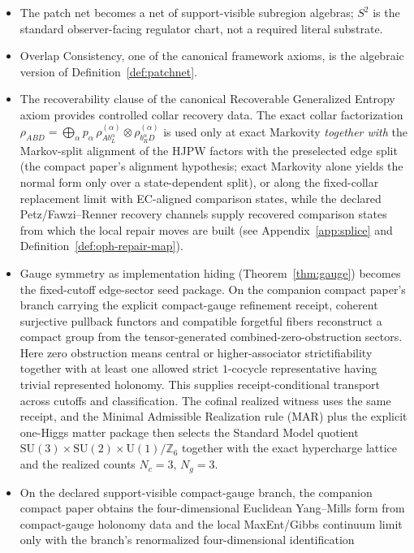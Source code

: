\documentclass[11pt]{article}
\theoremstyle{remark}
\theoremstyle{plain}
\begin{document}
\begin{itemize}
\item The patch net becomes a net of support-visible subregion algebras; \(S^2\) is the standard
observer-facing regulator chart, not a required literal substrate.
\item Overlap Consistency, one of the canonical framework axioms, is the algebraic version of Definition~\ref{def:patchnet}.
\item The recoverability clause of the canonical Recoverable Generalized Entropy axiom provides controlled collar recovery data. The exact collar factorization \(\rho_{ABD} = \bigoplus_\alpha p_\alpha\,\rho^{(\alpha)}_{Ab_L^\alpha}\otimes\rho^{(\alpha)}_{b_R^\alpha D}\) is used only at exact Markovity \emph{together with} the Markov-split alignment of the HJPW factors with the preselected edge split (the compact paper's alignment hypothesis; exact Markovity alone yields the normal form only over a state-dependent split), or along the fixed-collar replacement limit with EC-aligned comparison states, while the declared Petz/Fawzi--Renner recovery channels supply recovered comparison states from which the local repair moves are built (see Appendix~\ref{app:splice} and Definition~\ref{def:oph-repair-map}).
\item Gauge symmetry as implementation hiding (Theorem~\ref{thm:gauge}) becomes the fixed-cutoff edge-sector seed package. On the companion compact paper's branch carrying the explicit compact-gauge refinement receipt, coherent surjective pullback functors and compatible forgetful fibers reconstruct a compact group from the tensor-generated combined-zero-obstruction sectors. Here zero obstruction means central or higher-associator strictifiability together with at least one allowed strict \(1\)-cocycle representative having trivial represented holonomy. This supplies receipt-conditional transport across cutoffs and classification. The cofinal realized witness uses the same receipt, and the Minimal Admissible Realization rule (MAR) plus the explicit one-Higgs matter package then selects the Standard Model quotient $\mathrm{SU}(3)\times\mathrm{SU}(2)\times\mathrm{U}(1)/\mathbb{Z}_6$ together with the exact hypercharge lattice and the realized counts \(N_c=3\), \(N_g=3\).
\item On the declared support-visible compact-gauge branch, the companion compact paper obtains
the four-dimensional Euclidean Yang--Mills form from compact-gauge holonomy data and the local
MaxEnt/Gibbs continuum limit only with the branch's renormalized four-dimensional identification

\end{itemize}
\end{document}
